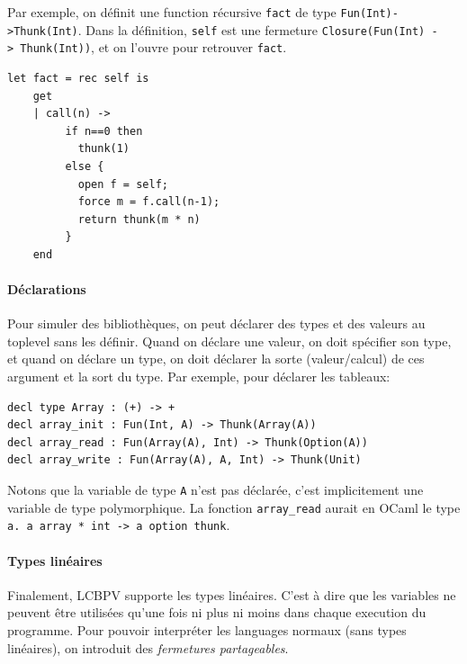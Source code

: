 \documentclass[12pt]{article}
\begin{document}
Par exemple, on définit une function récursive \texttt{fact} de type
\texttt{Fun(Int)-\textgreater{}Thunk(Int)}. Dans la définition,
\texttt{self} est une fermeture
\texttt{Closure(Fun(Int)\ -\textgreater{}\ Thunk(Int))}, et on l'ouvre
pour retrouver \texttt{fact}.

\newpage

\begin{verbatim}
let fact = rec self is
    get
    | call(n) -> 
         if n==0 then 
           thunk(1) 
         else {
           open f = self;
           force m = f.call(n-1);
           return thunk(m * n)
         }
    end
\end{verbatim}

\hypertarget{duxe9clarations}{%
      \paragraph*{Déclarations}\label{duxe9clarations}}

Pour simuler des bibliothèques, on peut déclarer des types et des
valeurs au toplevel sans les définir. Quand on déclare une valeur, on
doit spécifier son type, et quand on déclare un type, on doit déclarer
la sorte (valeur/calcul) de ces argument et la sort du type. Par
exemple, pour déclarer les tableaux:

\begin{verbatim}
decl type Array : (+) -> +
decl array_init : Fun(Int, A) -> Thunk(Array(A))
decl array_read : Fun(Array(A), Int) -> Thunk(Option(A))
decl array_write : Fun(Array(A), A, Int) -> Thunk(Unit)
\end{verbatim}

Notons que la variable de type \texttt{A} n'est pas déclarée, c'est
implicitement une variable de type polymorphique. La fonction
\texttt{array\_read} aurait en OCaml le type
\texttt{\textquotesingle{}a.\ \textquotesingle{}a\ array\ *\ int\ -\textgreater{}\ \textquotesingle{}a\ option\ thunk}.

\hypertarget{types-linuxe9aires}{%
      \paragraph*{Types linéaires}\label{types-linuxe9aires}}

Finalement, LCBPV supporte les types linéaires. C'est à dire que les
variables ne peuvent être utilisées qu'une fois ni plus ni moins dans
chaque execution du programme. Pour pouvoir interpréter les languages
normaux (sans types linéaires), on introduit des \emph{fermetures
      partageables}.
\end{document}

